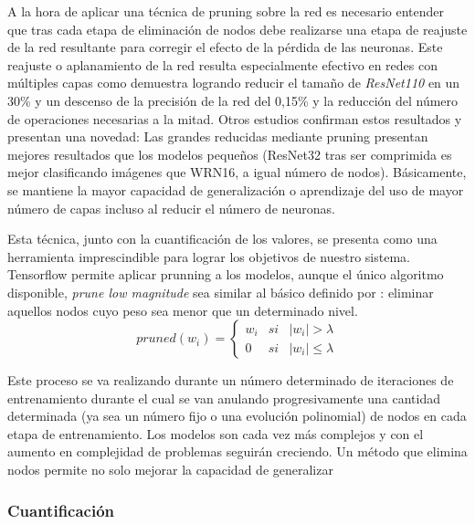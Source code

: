 A la hora de aplicar una técnica de pruning sobre la red es necesario entender que tras cada etapa de eliminación de nodos debe realizarse una etapa de reajuste de la red resultante para corregir el efecto de la pérdida de las neuronas. Este reajuste o aplanamiento de la red resulta especialmente efectivo en redes con múltiples capas como demuestra  logrando reducir el tamaño de \textit{ResNet110} en un 30\% y un descenso de la precisión de la red del 0,15\% y la reducción del número de operaciones necesarias a la mitad. Otros estudios\cite{Lee2019,Bartoldson2019,Han2015} confirman estos resultados y presentan una novedad: Las grandes reducidas mediante pruning presentan mejores resultados que los modelos pequeños (ResNet32 tras ser comprimida es mejor clasificando imágenes que WRN16, a igual número de nodos). Básicamente, se mantiene la mayor capacidad de generalización o aprendizaje del uso de mayor número de capas incluso al reducir el número de neuronas.

Esta técnica, junto con la cuantificación de los valores, se presenta como una herramienta imprescindible para lograr los objetivos de nuestro sistema. Tensorflow permite aplicar prunning a los modelos, aunque el único algoritmo disponible, \textit{prune low magnitude} sea similar al básico definido por : eliminar aquellos nodos cuyo peso sea menor que un determinado nivel.
\[
  pruned(w_{i})=\left\{
    \begin{array}{lcl}
      w_i & si & |w_i| > \lambda \\
      0 & si & |w_i|\leq  \lambda
    \end{array}
    \right.
\]

Este proceso se va realizando durante un número determinado de iteraciones de entrenamiento durante el cual se van anulando progresivamente una cantidad determinada (ya sea un número fijo o una evolución polinomial) de nodos en cada etapa de entrenamiento. \cite{Yann1989} Los modelos son cada vez más complejos y con el aumento en complejidad de problemas seguirán creciendo. Un método que elimina nodos permite no solo mejorar la capacidad de generalizar

\iffalse

  https://www.machinecurve.com/index.php/2020/09/23/tensorflow-model-optimization-an-introduction-to-pruning/
  ligeramente más técnico.
https://www.machinecurve.com/index.php/2020/09/29/tensorflow-pruning-schedules-constantsparsity-and-polynomialdecay/
\fi


\subsubsection{Cuantificación}

